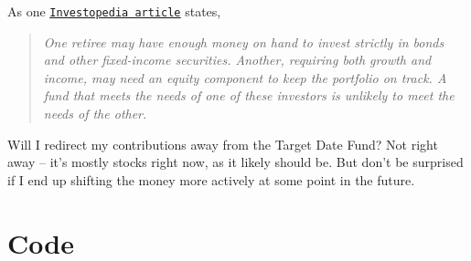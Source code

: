 \documentclass[11pt, oneside]{article}   	%
\begin{document}
As one {\color{blue} \tt \href{https://www.investopedia.com/articles/retirement/07/life_cycle.asp#ixzz5NBlgpyaP}{\underline{Investopedia article}}} states,
\begin{quote}
\it One retiree may have enough money on hand to invest strictly in bonds and other fixed-income securities. Another, requiring both growth and income, may need an equity component to keep the portfolio on track. A fund that meets the needs of one of these investors is unlikely to meet the needs of the other.
\end{quote}

Will I redirect my contributions away from the Target Date Fund? Not right away -- it's mostly stocks right now, as it likely should be. But don't be surprised if I end up shifting the money more actively at some point in the future.



%
%
%


\section{Code} \label{sec:code}
\end{document}
